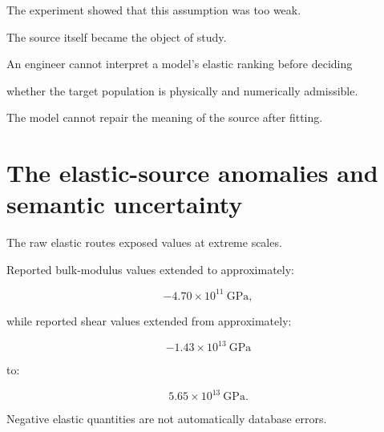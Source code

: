 \documentclass[11pt,a4paper,oneside]{report}
\begin{document}
The experiment showed that this assumption was too weak.



The source itself became the object of study.





\begin{engineeringconsequence}



An engineer cannot interpret a model's elastic ranking before deciding

whether the target population is physically and numerically admissible.



The model cannot repair the meaning of the source after fitting.



\end{engineeringconsequence}





\section{The elastic-source anomalies and semantic uncertainty}



The raw elastic routes exposed values at extreme scales.



Reported bulk-modulus values extended to approximately:



\begin{equation}
-4.70\times10^{11}
\ \mathrm{GPa},
\end{equation}



while reported shear values extended from approximately:



\begin{equation}
-1.43\times10^{13}
\ \mathrm{GPa}
\end{equation}



to:



\begin{equation}
5.65\times10^{13}
\ \mathrm{GPa}.
\end{equation}



Negative elastic quantities are not automatically database errors.
\end{document}
